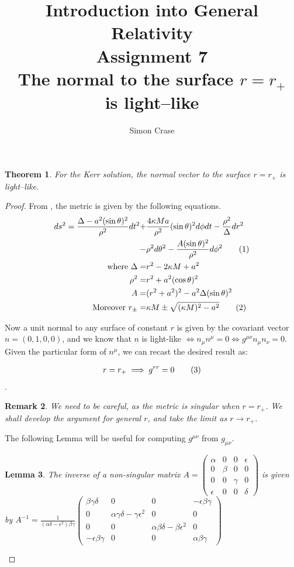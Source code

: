 \documentclass[]{article}
\title{Introduction into General Relativity\\Assignment 7\\The normal to the surface $r=r_+$\\is light--like}
\author{Simon Crase}
\newtheorem{theorem}{Theorem}
\newtheorem{lemma}[theorem]{Lemma}
\newtheorem{remark}[theorem]{Remark}
\newcommand\numberthis{\addtocounter{equation}{1}\tag{\theequation}}
\begin{document}
\maketitle

\begin{theorem}
	For the Kerr solution, the normal vector to the surface $r=r_+$ is light--like.
\end{theorem}

\begin{proof}
	From \cite[Lecture VII,5,(174)]{akhmedev2016}, the metric is given by the following equations.
	\begin{align*}
	ds^2 = \frac{\Delta-a^2 (\sin{\theta})^2}{\rho^2}dt^2 +& \frac{4 \kappa M a}{\rho^2}(\sin{\theta})^2 d\phi dt - \frac{\rho^2}{\Delta} dr^2\\
	-&\rho^2 d\theta^2 - \frac{A (\sin{\theta})^2}{\rho^2} d\phi^2 \numberthis \label{eq:metric}\\ 
	\text{where } \Delta =& r^2 - 2 \kappa M + a^2\\
	\rho^2 =& r^2 + a^2 (\cos{\theta})^2\\
	A =& (r^2+a^2)^2 - a^2 \Delta (\sin{\theta})^2 \\
	\text{Moreover } r_{\pm} = & \kappa M \pm \sqrt{(\kappa M)^2 - a^2} \numberthis \label{eq:rpm}
	\end{align*}
	
	Now a unit normal to any surface of constant $r$ is given by the covariant vector $n=(0,1,0,0)$, and we know that $n$ is light-like $\iff n_{\mu}n^{\mu}=0 \iff g^{\mu\nu}n_{\mu}n_{\nu}=0$. Given the particular form of $n^{\mu}$, we can recast the desired result as:
	
	\begin{align*}
	r=r_+ \implies g^{rr}=0 \numberthis \label{eq:demonstrandum}
	\end{align*}.

\begin{remark}
	We need to be careful, as the metric is singular when $r=r_+$. We shall develop the argument for general $r$, and take the limit as $r\rightarrow r_+$.
\end{remark}
 The following Lemma will be useful for computing $g^{\mu\nu}$ from $g_{\mu\nu}$.
\begin{lemma}\label{lemma:inverse}
	The inverse of a non-singular matrix  
	$A=\begin{pmatrix}
		\alpha & 0 & 0 & \epsilon \\
		0 & \beta & 0 & 0 \\
		0 & 0 & \gamma & 0 \\
		\epsilon & 0 & 0 & \delta
	\end{pmatrix}$ is given by  $A^{-1}=\frac{1}{(\alpha\delta-\epsilon^2)\beta\gamma}\begin{pmatrix}
	\beta\gamma\delta & 0 & 0 & -\epsilon\beta\gamma\\
	0 & \alpha\gamma\delta - \gamma \epsilon^2 & 0 & 0\\
	0 & 0 & \alpha\beta\delta - \beta \epsilon^2 & 0 \\
	-\epsilon\beta\gamma & 0 & 0 & \alpha\beta\gamma
	\end{pmatrix}
	$
\end{lemma}


\end{proof}
\end{document}
